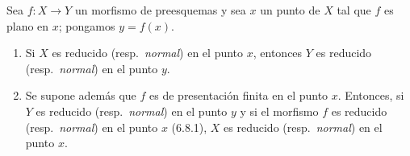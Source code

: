 \begin{proposition}[11.3.13]
\label{IV.11.3.13}
Sea $f:X\to Y$ un morfismo de preesquemas y sea $x$ un punto de $X$ tal que $f$ es plano en $x$; pongamos $y=f(x)$.
\begin{enumerate}[label=\emph{(\roman*)}]
  \item Si $X$ es reducido \textup{(resp.\ \emph{normal})} en el punto $x$, entonces $Y$ es reducido \textup{(resp.\ \emph{normal})} en el punto $y$.
  \item Se supone además que $f$ es de presentación finita en el punto $x$. Entonces, si $Y$ es reducido \textup{(resp.\ \emph{normal})} en el punto $y$ y si el morfismo $f$ es reducido \textup{(resp.\ \emph{normal})} en el punto $x$ \textup{(6.8.1)}, $X$ es reducido \textup{(resp.\ \emph{normal})} en el punto $x$.
\end{enumerate}
\end{proposition}

